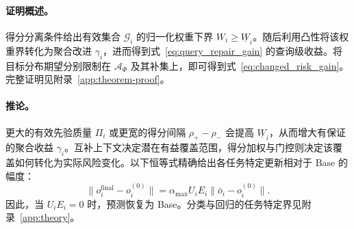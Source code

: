 \paragraph{证明概述。}
得分分离条件给出有效集合 $\mathcal G_i$ 的归一化权重下界 $W_i\geq\underline W_i$。随后利用凸性将该权重界转化为聚合改进 $\gamma_i$，进而得到式~\eqref{eq:query_repair_gain} 的查询级收益。将目标分布期望分别限制在 $\mathcal A_\Phi$ 及其补集上，即可得到式~\eqref{eq:changed_risk_gain}。完整证明见附录~\ref{app:theorem-proof}。

\paragraph{推论。}
更大的有效先验质量 $\Pi_i$ 或更宽的得分间隔 $\rho_+-\rho_-$ 会提高 $\underline W_i$，从而增大有保证的聚合收益 $\gamma_i$。互补上下文决定潜在有益覆盖范围，得分加权与门控则决定该覆盖如何转化为实际风险变化。以下恒等式精确给出各任务特定更新相对于 Base 的幅度：
\begin{equation}
  \lVert o_i^{\mathrm{final}}-o_i^{(0)}\rVert
  =\alpha_{\max}U_iE_i
   \lVert\bar o_i-o_i^{(0)}\rVert.
  \label{eq:base_preservation_identity}
\end{equation}
因此，当 $U_iE_i=0$ 时，预测恢复为 Base。分类与回归的任务特定界见附录~\ref{app:theory}。
